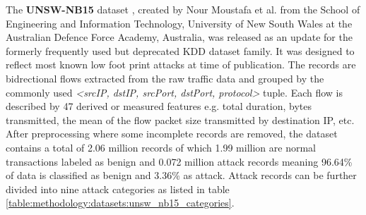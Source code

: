The \textbf{UNSW-NB15} dataset \cite{unsw_nb15}, created by Nour Moustafa et al. from the School of Engineering and Information Technology, University of New South Wales at the Australian Defence Force Academy, Australia, was released as an update for the formerly frequently used but deprecated \cite{unsw_nb15} KDD dataset family. It was designed to reflect most known low foot print attacks at time of publication. The records are bidrectional flows extracted from the raw traffic data and grouped by the commonly used \textit{<srcIP, dstIP, srcPort, dstPort, protocol>} tuple. Each flow is described by 47 derived or measured features e.g. total duration, bytes transmitted, the mean of the flow packet size transmitted by destination IP, etc. After preprocessing where some incomplete records are removed, the dataset contains a total of 2.06 million records of which 1.99 million are normal transactions labeled as benign and 0.072 million attack records meaning 96.64\% of data is classified as benign and 3.36\% as attack. Attack records can be further divided into nine attack categories as listed in table \ref{table:methodology:datasets:unsw_nb15_categories}.

